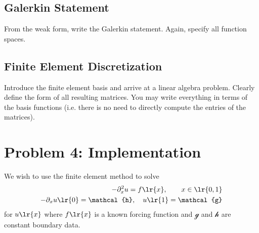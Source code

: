 \documentclass[11pt]{article}
\begin{document}
    \subsection{Galerkin Statement}
    From the weak form, write the Galerkin statement.  Again, specify all function spaces.\\
    
    

    \subsection{Finite Element Discretization} Introduce the finite element basis and arrive at a linear algebra problem.  Clearly define the form of all resulting matrices.  You may write everything in terms of the basis functions (i.e. there is no need to directly compute the entries of the matrices).\\

    

\newpage
  \section{Problem 4: Implementation}
  We wish to use the finite element method to solve 
  \begin{align}
    - \partial_{x}^{2} u = f\lr{x}, \qquad x \in \lr{0, 1} \\
    -\partial_{x}u\lr{0} = \mathcal{h}, \quad u\lr{1} = \mathcal{g}
  \end{align}
  for $u\lr{x}$ where $f\lr{x}$ is a known forcing function and $\mathcal{g}$ and $\mathcal{h}$ are constant boundary data.
\end{document}
